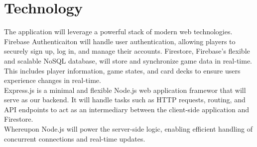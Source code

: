 \section{Technology}
The application will leverage a powerful stack of modern web technologies. Firebase Authenticaiton will handle user authentication, allowing players to securely sign up, log in, and manage their accounts. Firestore, Firebase's flexible and scalable NoSQL database, will store and synchronize game data in real-time. This includes player information, game states, and card decks to ensure users experience changes in real-time.\\ 

Express.js is a minimal and flexible Node.js web application framewor that will serve as our backend. It will handle tasks such as HTTP requests, routing, and API endpoints to act as an intermediary between the client-side application and Firestore.\\

Whereupon Node.js will power the server-side logic, enabling efficient handling of concurrent connections and real-time updates.